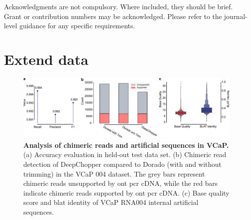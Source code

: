 \documentclass[pdflatex,sn-nature, lineno]{sn-jnl}%
\theoremstyle{thmstyleone}%
\theoremstyle{thmstyletwo}%
\theoremstyle{thmstylethree}%
\begin{document}
Acknowledgments are not compulsory. Where included, they should be brief. Grant or contribution numbers may be acknowledged.
Please refer to the journal-level guidance for any specific requirements.


\backmatter

\begin{appendices}
	\printglossaries[type=\acronymtype, title=Abbreviations]
\end{appendices}



\newpage

\section{Extend data}

\renewcommand{\figurename}{Extended Data Fig.}


\begin{figure}[!h]
	\includegraphics[height=0.29\columnwidth]{finals/sf1}
	\caption{ {\bf Analysis of chimeric reads and artificial sequences in VCaP.} (a) Accuracy evaluation in held-out test data set. (b) Chimeric read detection of DeepChopper compared to Dorado (with and without trimming) in the VCaP 004 dataset. The grey bars represent chimeric reads unsupported by \gls{ont} \gls{pcr} cDNA, while the red bars indicate chimeric reads supported by \gls{ont} \gls{pcr} cDNA.  (c) Base quality score and \gls{blat} identity of VCaP RNA004 internal artificial sequences.}\label{fig:sf1}
\end{figure}
\end{document}
